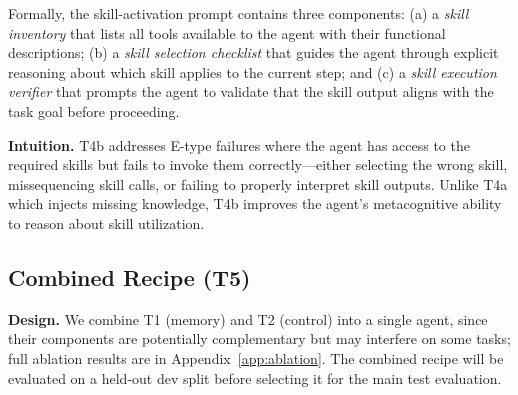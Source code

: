 Formally, the skill-activation prompt contains three components: (a) a \emph{skill inventory} that lists all tools available to the agent with their functional descriptions; (b) a \emph{skill selection checklist} that guides the agent through explicit reasoning about which skill applies to the current step; and (c) a \emph{skill execution verifier} that prompts the agent to validate that the skill output aligns with the task goal before proceeding.

\textbf{Intuition.} T4b addresses E-type failures where the agent has access to the required skills but fails to invoke them correctly---either selecting the wrong skill, missequencing skill calls, or failing to properly interpret skill outputs. Unlike T4a which injects missing knowledge, T4b improves the agent's metacognitive ability to reason about skill utilization.


\subsection{Combined Recipe (T5)}
\label{sec:recipes:combined}

\textbf{Design.} We combine T1 (memory) and T2 (control) into a single agent, since their components are potentially complementary but may interfere on some tasks; full ablation results are in Appendix~\ref{app:ablation}. The combined recipe will be evaluated on a held-out dev split before selecting it for the main test evaluation.
